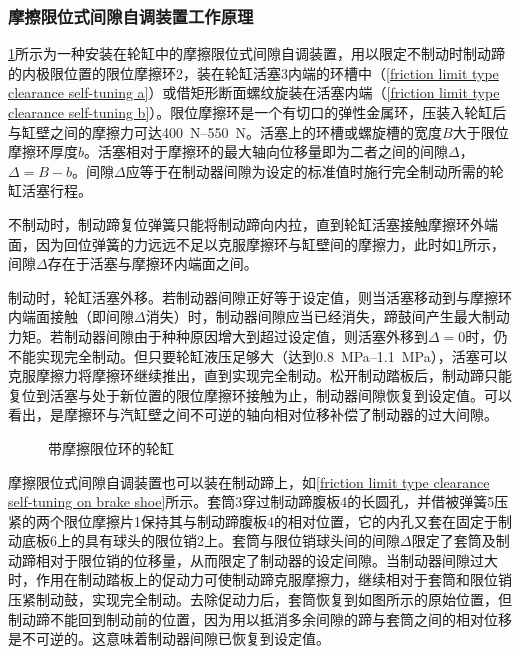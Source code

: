 \documentclass[UTF8]{ctexart}
\numberwithin{figure}{section}
\numberwithin{table}{section}
\begin{document}
\subsubsection{摩擦限位式间隙自调装置工作原理}

\cref{friction limit type clearance self-tuning}所示为一种安装在轮缸中的摩擦限位式间隙自调装置，用以限定不制动时制动蹄的内极限位置的限位摩擦环2，装在轮缸活塞3内端的环槽中（\cref{friction limit type clearance self-tuning a}）或借矩形断面螺纹旋装在活塞内端（\cref{friction limit type clearance self-tuning b}）。限位摩擦环是一个有切口的弹性金属环，压装入轮缸后与缸壁之间的摩擦力可达\qtyrange[range-phrase = $\,\sim\,$, range-units = single]{400}{550}{\newton}。活塞上的环槽或螺旋槽的宽度$B$大于限位摩擦环厚度$b$。活塞相对于摩擦环的最大轴向位移量即为二者之间的间隙$\Delta$，$\Delta=B-b$。间隙$\Delta$应等于在制动器间隙为设定的标准值时施行完全制动所需的轮缸活塞行程。

不制动时，制动蹄复位弹簧只能将制动蹄向内拉，直到轮缸活塞接触摩擦环外端面，因为回位弹簧的力远远不足以克服摩擦环与缸壁间的摩擦力，此时如\cref{friction limit type clearance self-tuning}所示，间隙$\Delta$存在于活塞与摩擦环内端面之间。

制动时，轮缸活塞外移。若制动器间隙正好等于设定值，则当活塞移动到与摩擦环内端面接触（即间隙$\Delta$消失）时，制动器间隙应当已经消失，蹄鼓间产生最大制动力矩。若制动器间隙由于种种原因增大到超过设定值，则活塞外移到$\Delta=0$时，仍不能实现完全制动。但只要轮缸液压足够大（达到\qtyrange[range-phrase = $\,\sim\,$, range-units = single]{0.8}{1.1}{\mega\pascal}），活塞可以克服摩擦力将摩擦环继续推出，直到实现完全制动。松开制动踏板后，制动蹄只能复位到活塞与处于新位置的限位摩擦环接触为止，制动器间隙恢复到设定值。可以看出，是摩擦环与汽缸壁之间不可逆的轴向相对位移补偿了制动器的过大间隙。

\begin{figure}[htbp]
	\centering
	\begin{minipage}[b]{\textwidth}
		\centering
		\caption{带摩擦限位环的轮缸}
		\label{friction limit type clearance self-tuning}
	\end{minipage}
\end{figure}

摩擦限位式间隙自调装置也可以装在制动蹄上，如\cref{friction limit type clearance self-tuning on brake shoe}所示。套筒3穿过制动蹄腹板4的长圆孔，并借被弹簧5压紧的两个限位摩擦片1保持其与制动蹄腹板4的相对位置，它的内孔又套在固定于制动底板6上的具有球头的限位销2上。套筒与限位销球头间的间隙$\Delta$限定了套筒及制动蹄相对于限位销的位移量，从而限定了制动器的设定间隙。当制动器间隙过大时，作用在制动踏板上的促动力可使制动蹄克服摩擦力，继续相对于套筒和限位销压紧制动鼓，实现完全制动。去除促动力后，套筒恢复到如图所示的原始位置，但制动蹄不能回到制动前的位置，因为用以抵消多余间隙的蹄与套筒之间的相对位移是不可逆的。这意味着制动器间隙已恢复到设定值。
\end{document}
